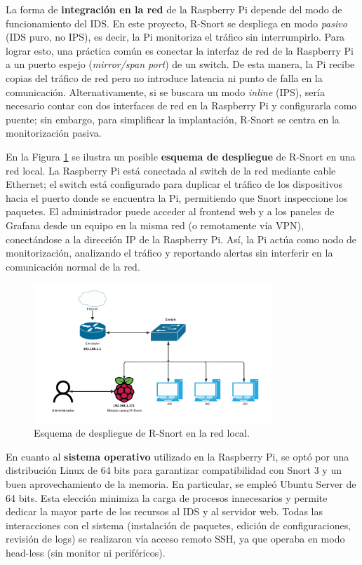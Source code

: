 \documentclass[11pt,a4paper,twoside]{report}
\begin{document}
La forma de \textbf{integración en la red} de la Raspberry Pi depende del modo de funcionamiento del IDS. En este proyecto, R-Snort se despliega en modo \emph{pasivo} (IDS puro, no IPS), es decir, la Pi monitoriza el tráfico sin interrumpirlo. Para lograr esto, una práctica común es conectar la interfaz de red de la Raspberry Pi a un puerto espejo (\emph{mirror/span port}) de un switch. De esta manera, la Pi recibe copias del tráfico de red pero no introduce latencia ni punto de falla en la comunicación. Alternativamente, si se buscara un modo \emph{inline} (IPS), sería necesario contar con dos interfaces de red en la Raspberry Pi y configurarla como puente; sin embargo, para simplificar la implantación, R-Snort se centra en la monitorización pasiva.\newline

En la Figura \ref{fig:despliegue} se ilustra un posible \textbf{esquema de despliegue} de R-Snort en una red local. La Raspberry Pi está conectada al switch de la red mediante cable Ethernet; el switch está configurado para duplicar el tráfico de los dispositivos hacia el puerto donde se encuentra la Pi, permitiendo que Snort inspeccione los paquetes. El administrador puede acceder al frontend web y a los paneles de Grafana desde un equipo en la misma red (o remotamente vía VPN), conectándose a la dirección IP de la Raspberry Pi. Así, la Pi actúa como nodo de monitorización, analizando el tráfico y reportando alertas sin interferir en la comunicación normal de la red.\newline

\begin{figure}[H]
	\centering
	\includegraphics[width=0.8\textwidth]{documento/4.png}
	\caption{Esquema de despliegue de R-Snort en la red local.}
	\label{fig:despliegue}
\end{figure}

En cuanto al \textbf{sistema operativo} utilizado en la Raspberry Pi, se optó por una distribución Linux de 64 bits para garantizar compatibilidad con Snort 3 y un buen aprovechamiento de la memoria. En particular, se empleó Ubuntu Server de 64 bits. Esta elección minimiza la carga de procesos innecesarios y permite dedicar la mayor parte de los recursos al IDS y al servidor web. Todas las interacciones con el sistema (instalación de paquetes, edición de configuraciones, revisión de logs) se realizaron vía acceso remoto SSH, ya que operaba en modo head-less (sin monitor ni periféricos).\newline
\end{document}

